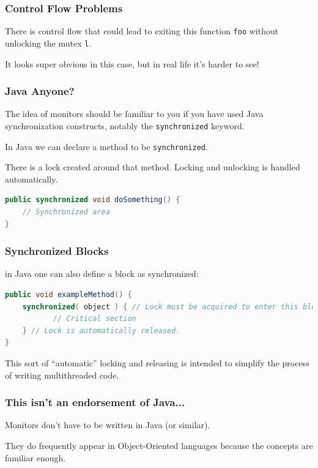 \begin{frame}
\frametitle{Control Flow Problems}

There is control flow that could lead to exiting this function \texttt{foo} without unlocking the mutex \texttt{l}.

It looks super obvious in this case, but in real life it's harder to see!

\end{frame}

\begin{frame}[fragile]
\frametitle{Java Anyone?}

The idea of monitors should be familiar to you if you have used Java synchronization constructs, notably the \texttt{synchronized} keyword. 

In Java we can declare a method to be \texttt{synchronized}.

There is a lock created around that method. Locking and unlocking is handled automatically.

\begin{lstlisting}[language=Java]
public synchronized void doSomething() {
    // Synchronized area
}
\end{lstlisting}

\end{frame}

\begin{frame}[fragile]
\frametitle{Synchronized Blocks}

in Java one can also define a block as synchronized:

\begin{lstlisting}[language=Java]
public void exampleMethod() {
    synchronized( object ) { // Lock must be acquired to enter this block
           // Critical section 
    } // Lock is automatically released.
}
\end{lstlisting}

This sort of ``automatic'' locking and releasing is intended to simplify the process of writing multithreaded code.

\end{frame}

\begin{frame}
\frametitle{This isn't an endorsement of Java...}

Monitors don't have to be written in Java (or similar).

They do frequently appear in Object-Oriented languages because the concepts are familiar enough.


\end{frame}

